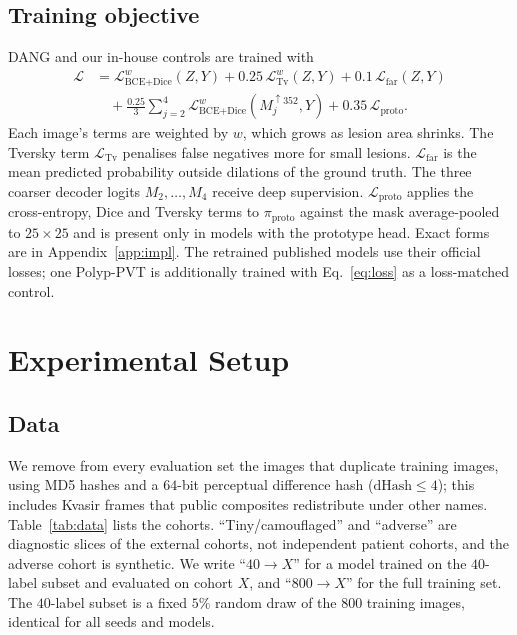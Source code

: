 \documentclass[10pt,twocolumn]{article}
\begin{document}
\subsection{Training objective}
DANG and our in-house controls are trained with
\begin{align}
  \mathcal{L} &= \mathcal{L}_{\text{BCE+Dice}}^{w}(Z,Y)+0.25\,\mathcal{L}_{\text{Tv}}^{w}(Z,Y)+0.1\,\mathcal{L}_{\text{far}}(Z,Y)\nonumber\\
  &\quad +\tfrac{0.25}{3}\textstyle\sum_{j=2}^{4}\mathcal{L}_{\text{BCE+Dice}}^{w}(M_j^{\uparrow352},Y)+0.35\,\mathcal{L}_{\text{proto}}.
  \label{eq:loss}
\end{align}
Each image's terms are weighted by $w$, which grows as lesion area shrinks. The Tversky term $\mathcal{L}_{\text{Tv}}$ penalises false negatives more for small lesions. $\mathcal{L}_{\text{far}}$ is the mean predicted probability outside dilations of the ground truth. The three coarser decoder logits $M_2,\dots,M_4$ receive deep supervision. $\mathcal{L}_{\text{proto}}$ applies the cross-entropy, Dice and Tversky terms to $\pi_{\text{proto}}$ against the mask average-pooled to $25\times25$ and is present only in models with the prototype head. Exact forms are in Appendix~\ref{app:impl}. The retrained published models use their official losses; one Polyp-PVT is additionally trained with Eq.~\eqref{eq:loss} as a loss-matched control.

\section{Experimental Setup}
\subsection{Data}
We remove from every evaluation set the images that duplicate training images, using MD5 hashes and a $64$-bit perceptual difference hash ($\text{dHash}\le4$); this includes Kvasir frames that public composites redistribute under other names. Table~\ref{tab:data} lists the cohorts. ``Tiny/camouflaged'' and ``adverse'' are diagnostic slices of the external cohorts, not independent patient cohorts, and the adverse cohort is synthetic. We write ``$40\to X$'' for a model trained on the $40$-label subset and evaluated on cohort $X$, and ``$800\to X$'' for the full training set. The $40$-label subset is a fixed $5\%$ random draw of the $800$ training images, identical for all seeds and models.
\end{document}
